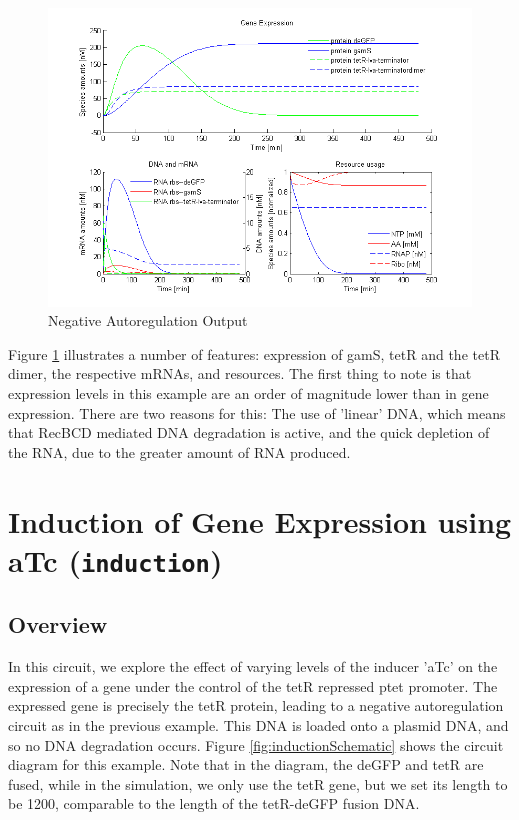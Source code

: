 \documentclass[english]{report}
\begin{document}
		\begin{figure}
		\begin{center}
		\includegraphics[width=\textwidth]{NegativeAutoregulationPlotActuallyProducedByCode.png} 
		\caption{Negative Autoregulation Output}
		\label{fig:negautoreg}
		\end{center}
		
		\end{figure}
		Figure \ref{fig:negautoreg} illustrates a number of features: expression of gamS, tetR and the tetR dimer, the respective mRNAs, and resources. The first thing to note is that expression levels in this example are an order of magnitude lower than in gene expression. There are two reasons for this: The use of 'linear' DNA, which means that RecBCD mediated DNA degradation is active, and the quick depletion of the RNA, due to the greater amount of RNA produced.  
		
	\section{Induction of Gene Expression using aTc (\texttt{induction})}
		\subsection{Overview}
		In this circuit, we explore the effect of varying levels of the inducer 'aTc' on the expression of a gene under the control of the tetR repressed ptet promoter. The expressed gene is precisely the tetR protein, leading to a negative autoregulation circuit as in the previous example. This DNA is loaded onto a plasmid DNA, and so no DNA degradation occurs. Figure \ref{fig:inductionSchematic} shows the circuit diagram for this example. Note that in the diagram, the deGFP and tetR are fused, while in the simulation, we only use the tetR gene, but we set its length to be 1200, comparable to the length of the tetR-deGFP fusion DNA. \\ 
\end{document}
